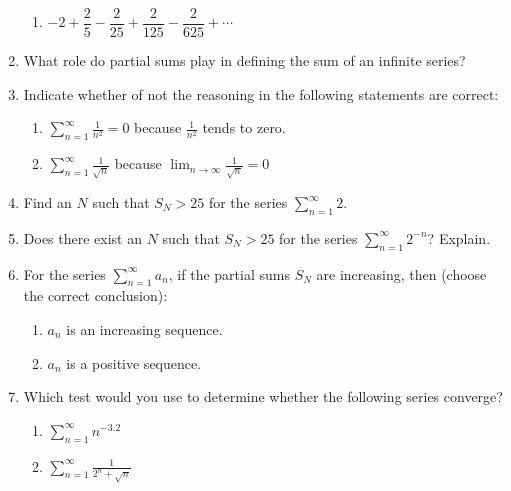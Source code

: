 \documentclass{nosvagor-notes}
\begin{document}
\begin{enumerate}
\begin{enumerate}
      \item \(-2 + \dfrac{2}{5} - \dfrac{2}{25} + \dfrac{2}{125} - \dfrac{2}{625} + \cdots \)
    \end{enumerate}
  \newpage

  \item What role do partial sums play in defining the sum of an infinite
    series?
    \vspace{90pt}

  \item Indicate whether of not the reasoning in the following statements are
    correct:
    \begin{enumerate}
      \item \(\displaystyle \sum_{n=1}^{\infty} \frac{1}{n^2} = 0\) because
        \(\frac{1}{n^2}\) tends to zero.
      \vspace{110pt}

      \item \(\displaystyle \sum_{n=1}^{\infty} \frac{1}{\sqrt{n}}\) because
        \(\displaystyle \lim_{n \to \infty}\frac{1}{\sqrt{n} } = 0\)
      \vspace{110pt}
    \end{enumerate}

  \item Find an \(N\) such that \(S_N > 25\) for the series \(\displaystyle
    \sum_{n=1}^{\infty} 2\).
    \vspace{110pt}

  \item Does there exist an \(N\) such that \(S_N > 25\) for the series
    \(\displaystyle \sum_{n=1}^{\infty} 2^{-n}\)? Explain.
    \vspace{90pt}

  \newpage

  \item For the series \(\displaystyle \sum_{n=1}^{\infty} a_n\), if the
    partial sums \(S_N\) are increasing, then (choose the correct conclusion):
    \begin{enumerate}
      \item \({a_n}\) is an increasing sequence.
      \item \({a_n}\) is a positive sequence.
    \end{enumerate}
  \vspace{60pt}

  \item Which test would you use to determine whether the following series converge?
  \begin{enumerate}
    \item \(\displaystyle \sum_{n=1}^{\infty} n^{-3.2}\)
  \vspace{110pt}

    \item \(\displaystyle \sum_{n=1}^{\infty} \frac{1}{2^n + \sqrt{n} }\)
  \vspace{110pt}
  \end{enumerate}

\end{enumerate}
\end{document}
